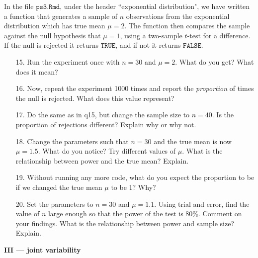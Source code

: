 \documentclass[10pt]{extarticle}
\begin{document}
\newpage

In the file $\texttt{ps3.Rmd}$, under the header ``exponential distribution", we have written a function that generates a sample of $n$ observations from the exponential distribution which has true mean $\mu = 2$. The function then compares the sample against the null hypothesis that
$\mu = 1$, using a two-sample $t$-test for a difference. If the null is rejected it returns $\texttt{TRUE}$, and if not it returns $\texttt{FALSE}$.  

\hfill 

\begin{itemize}

	\item[15.] Run the experiment once with $n = 30$ and $\mu = 2$. What do you get? What does it mean? \\ 

	\item[16.] Now, repeat the experiment 1000 times and report the {\it proportion} of times the null is rejected. What does this value represent? \\ 

	\item[17.] Do the same as in q15, but change the sample size to $n = 40$. Is the proportion of rejections different? Explain why or why not. \\ 

	\item[18.] Change the parameters such that $n = 30$ and the true mean is now $\mu = 1.5$. What do you notice? Try different values of $\mu$. What is the relationship between power and the true mean? Explain. \\  

	\item[19.] Without running any more code, what do you expect the proportion to be if we changed the true mean $\mu$ to be 1? Why? \\ 

	\item[20.] Set the parameters to $n=30$ and $\mu = 1.1$. Using trial and error, find the value of $n$ large enough so that the power of the test is 80\%. Comment on your findings. What is the relationship between power and sample size? Explain.   

\end{itemize}

\hfill 

{\Large \bf III --- joint variability} \\ 
\end{document}
